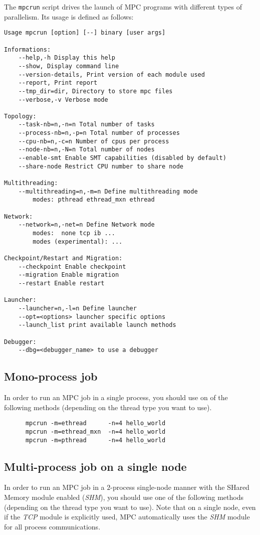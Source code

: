 \documentclass[a4paper,11pt]{article}
\begin{document}
The \texttt{mpcrun} script drives the launch of MPC programs with different
types of parallelism.
Its usage is defined as follows:
\begin{verbatim}
Usage mpcrun [option] [--] binary [user args]

Informations:
    --help,-h Display this help
    --show, Display command line
    --version-details, Print version of each module used
    --report, Print report
    --tmp_dir=dir, Directory to store mpc files
    --verbose,-v Verbose mode

Topology:
    --task-nb=n,-n=n Total number of tasks
    --process-nb=n,-p=n Total number of processes
    --cpu-nb=n,-c=n Number of cpus per process
    --node-nb=n,-N=n Total number of nodes
    --enable-smt Enable SMT capabilities (disabled by default)
    --share-node Restrict CPU number to share node

Multithreading:
    --multithreading=n,-m=n Define multithreading mode
        modes: pthread ethread_mxn ethread

Network:
    --network=n,-net=n Define Network mode
        modes:  none tcp ib ...
        modes (experimental): ...

Checkpoint/Restart and Migration:
    --checkpoint Enable checkpoint
    --migration Enable migration
    --restart Enable restart

Launcher:
    --launcher=n,-l=n Define launcher
    --opt=<options> launcher specific options
    --launch_list print available launch methods

Debugger:
    --dbg=<debugger_name> to use a debugger

\end{verbatim}

\subsection{Mono-process job}
In order to run an MPC job in a single process, you should use on of the following methods (depending on the thread type you want to use).

\begin{verbatim}
      mpcrun -m=ethread      -n=4 hello_world
      mpcrun -m=ethread_mxn  -n=4 hello_world
      mpcrun -m=pthread      -n=4 hello_world
\end{verbatim}


\subsection{Multi-process job on a single node}
In order to run an MPC job in a $2$-process single-node manner with the SHared Memory module enabled (\emph{SHM}),
you should use one of the following methods (depending on the thread type you want to use).
Note that on a single node, even if the \emph{TCP} module is explicitly used,
MPC automatically uses the \emph{SHM} module for all process communications.
\end{document}
